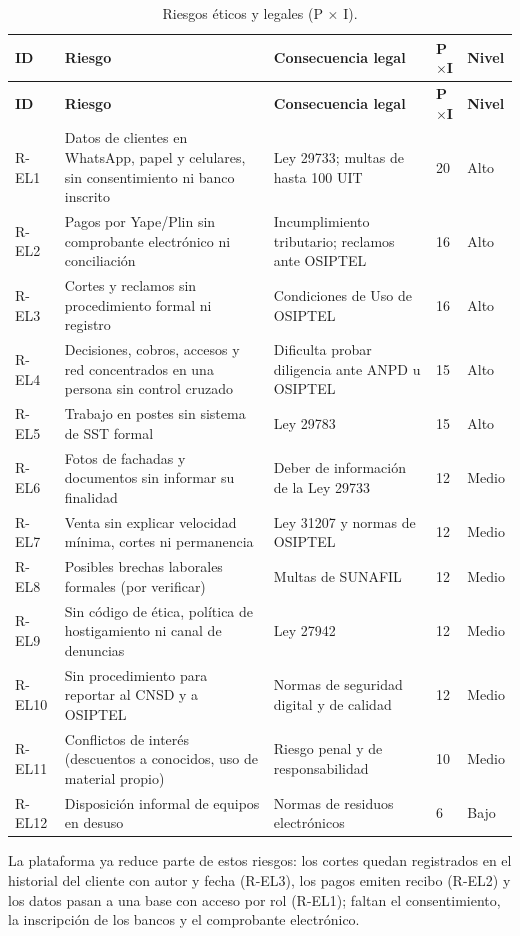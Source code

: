 {\small
\begin{longtable}{L{1.1cm}L{6.0cm}L{4.2cm}C{0.7cm}L{1.0cm}}
\caption{Riesgos éticos y legales (P $\times$ I).}\label{tab:anx-etica-riesgos}\\
\toprule
\textbf{ID} & \textbf{Riesgo} & \textbf{Consecuencia legal} & \textbf{P$\times$I} & \textbf{Nivel} \\
\midrule
\endfirsthead
\toprule
\textbf{ID} & \textbf{Riesgo} & \textbf{Consecuencia legal} & \textbf{P$\times$I} & \textbf{Nivel} \\
\midrule
\endhead
\bottomrule
\endlastfoot
R-EL1 & Datos de clientes en WhatsApp, papel y celulares, sin consentimiento ni banco inscrito & Ley 29733; multas de hasta 100 UIT & 20 & Alto \\
R-EL2 & Pagos por Yape/Plin sin comprobante electrónico ni conciliación & Incumplimiento tributario; reclamos ante OSIPTEL & 16 & Alto \\
R-EL3 & Cortes y reclamos sin procedimiento formal ni registro & Condiciones de Uso de OSIPTEL & 16 & Alto \\
R-EL4 & Decisiones, cobros, accesos y red concentrados en una persona sin control cruzado & Dificulta probar diligencia ante ANPD u OSIPTEL & 15 & Alto \\
R-EL5 & Trabajo en postes sin sistema de SST formal & Ley 29783 & 15 & Alto \\
R-EL6 & Fotos de fachadas y documentos sin informar su finalidad & Deber de información de la Ley 29733 & 12 & Medio \\
R-EL7 & Venta sin explicar velocidad mínima, cortes ni permanencia & Ley 31207 y normas de OSIPTEL & 12 & Medio \\
R-EL8 & Posibles brechas laborales formales (por verificar) & Multas de SUNAFIL & 12 & Medio \\
R-EL9 & Sin código de ética, política de hostigamiento ni canal de denuncias & Ley 27942 & 12 & Medio \\
R-EL10 & Sin procedimiento para reportar al CNSD y a OSIPTEL & Normas de seguridad digital y de calidad & 12 & Medio \\
R-EL11 & Conflictos de interés (descuentos a conocidos, uso de material propio) & Riesgo penal y de responsabilidad & 10 & Medio \\
R-EL12 & Disposición informal de equipos en desuso & Normas de residuos electrónicos & 6 & Bajo \\
\end{longtable}
}

\noindent La plataforma ya reduce parte de estos riesgos: los cortes quedan registrados en el
historial del cliente con autor y fecha (R-EL3), los pagos emiten recibo (R-EL2) y los datos
pasan a una base con acceso por rol (R-EL1); faltan el consentimiento, la inscripción de los
bancos y el comprobante electrónico.

